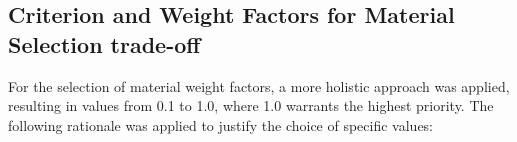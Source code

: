 \subsection{Criterion and Weight Factors for Material Selection trade-off}
\label{sec:Mat_sel}
For the selection of material weight factors, a more holistic approach was applied, resulting in values from 0.1 to 1.0, where 1.0 warrants the highest priority. The following rationale was applied to justify the choice of specific values:

